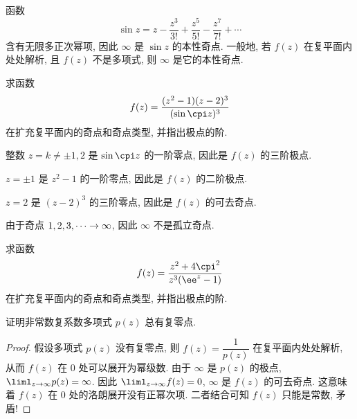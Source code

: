 \begin{example}
  函数 
  \[
    \sin z=z-\frac{z^3}{3!}+\frac{z^5}{5!}-\frac{z^7}{7!}+\cdots
  \]
  含有无限多正次幂项, 因此 $\infty$ 是 $\sin z$ 的本性奇点.
  一般地, 若 $f(z)$ 在复平面内处处解析, 且 $f(z)$ 不是多项式, 则 $\infty$ 是它的本性奇点.
\end{example}

\begin{example}
  求函数
  \[
    f(z)=\dfrac{(z^2-1)(z-2)^3}{(\sin{\cpi z})^3}
  \]
  在扩充复平面内的奇点和奇点类型, 并指出极点的阶.
\end{example}

\begin{solutionenum}
  \item 整数 $z=k\neq \pm1,2$ 是 $\sin{\cpi z}$ 的一阶零点, 因此是 $f(z)$ 的三阶极点.
  \item $z=\pm1$ 是 $z^2-1$ 的一阶零点, 因此是 $f(z)$ 的二阶极点.
  \item $z=2$ 是 $(z-2)^3$ 的三阶零点, 因此是 $f(z)$ 的可去奇点.
  \item 由于奇点 $1,2,3,\cdots\rightarrow \infty$, 因此 $\infty$ 不是孤立奇点.
\end{solutionenum}

\begin{exercise}
  求函数
  \[
    f(z)=\dfrac{z^2+4\cpi^2}{z^3(\ee^z-1)}
  \]
  在扩充复平面内的奇点和奇点类型, 并指出极点的阶.
\end{exercise}

\begin{example}[代数学基本定理]
  \label{exam:algebraic-basic-theorem}
  证明非常数复系数多项式 $p(z)$ 总有复零点.\footnotemark
\end{example}

\begin{proof}
  假设多项式 $p(z)$ 没有复零点, 则 $f(z)=\dfrac1{p(z)}$ 在复平面内处处解析, 从而 $f(z)$ 在 $0$ 处可以展开为幂级数.
  由于 $\infty$ 是 $p(z)$ 的极点, $\liml_{z\ra\infty}p(z)=\infty$.
  因此 $\liml_{z\ra\infty}f(z)=0$, $\infty$ 是 $f(z)$ 的可去奇点.
  这意味着 $f(z)$ 在 $0$ 处的洛朗展开没有正幂次项.
  二者结合可知 $f(z)$ 只能是常数, 矛盾!
\end{proof}



\startwidepage
{}


